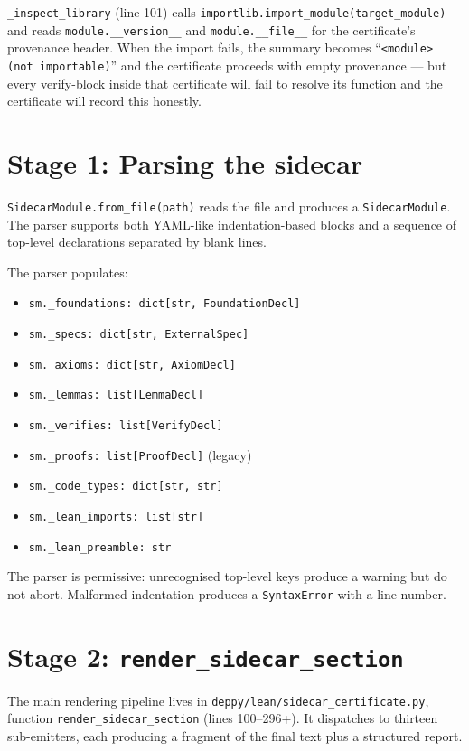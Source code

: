 \texttt{\_inspect\_library} (line 101) calls
\texttt{importlib.import\_module(target\_module)} and reads
\texttt{module.\_\_version\_\_} and
\texttt{module.\_\_file\_\_} for the certificate's provenance
header.  When the import fails, the summary becomes
``\texttt{<module> (not importable)}'' and the certificate proceeds
with empty provenance --- but every verify-block inside that
certificate will fail to resolve its function and the certificate
will record this honestly.

\section{Stage 1: Parsing the sidecar}

\texttt{SidecarModule.from\_file(path)} reads the file and produces a
\texttt{SidecarModule}.  The parser supports both YAML-like
indentation-based blocks and a sequence of top-level declarations
separated by blank lines.

The parser populates:
\begin{itemize}[leftmargin=1.7em]
  \item \verb|sm._foundations: dict[str, FoundationDecl]|
  \item \verb|sm._specs: dict[str, ExternalSpec]|
  \item \verb|sm._axioms: dict[str, AxiomDecl]|
  \item \verb|sm._lemmas: list[LemmaDecl]|
  \item \verb|sm._verifies: list[VerifyDecl]|
  \item \verb|sm._proofs: list[ProofDecl]| (legacy)
  \item \verb|sm._code_types: dict[str, str]|
  \item \verb|sm._lean_imports: list[str]|
  \item \verb|sm._lean_preamble: str|
\end{itemize}

The parser is permissive: unrecognised top-level keys produce a
warning but do not abort.  Malformed indentation produces a
\texttt{SyntaxError} with a line number.

\section{Stage 2: \texttt{render\_sidecar\_section}}

The main rendering pipeline lives in
\texttt{deppy/lean/sidecar\_certificate.py}, function
\texttt{render\_sidecar\_section} (lines 100--296+).  It dispatches
to thirteen sub-emitters, each producing a fragment of the final
\Lean{} text plus a structured report.

